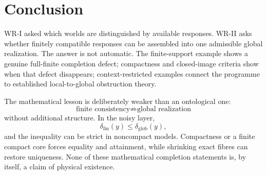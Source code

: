 \documentclass[11pt]{article}
\begin{document}
\section*{Conclusion}

WR-I asked which worlds are distinguished by available responses. WR-II asks
whether finitely compatible responses can be assembled into one admissible
global realization. The answer is not automatic. The finite-support example
shows a genuine full-finite completion defect; compactness and closed-image
criteria show when that defect disappears; context-restricted examples connect
the programme to established local-to-global obstruction theory.

The mathematical lesson is deliberately weaker than an ontological one:
\[
\text{finite consistency}
\not\Rightarrow
\text{global realization}
\]
without additional structure. In the noisy layer,
\[
\delta_{\mathrm{fin}}(y)
\le
\delta_{\mathrm{glob}}(y),
\]
and the inequality can be strict in noncompact models. Compactness or a finite
compact core forces equality and attainment, while shrinking exact fibres can
restore uniqueness. None of these mathematical completion statements is, by
itself, a claim of physical existence.
\end{document}
